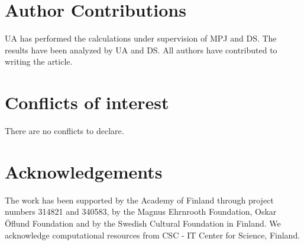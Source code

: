 \documentclass[twoside,twocolumn,9pt]{article}
\renewcommand{\refname}{Notes and references}
\begin{document}
\section*{Author Contributions} 

UA has performed the calculations under supervision of MPJ and DS. The results
have been analyzed by UA and DS. All authors have contributed to writing the 
article.
 
\section*{Conflicts of interest}

There are no conflicts to declare.

\section*{Acknowledgements}

The work has been supported by the Academy of Finland through project numbers
314821 and 340583, by the Magnus Ehrnrooth Foundation, Oskar {\"O}flund
Foundation and by the Swedish Cultural Foundation in Finland. We acknowledge
computational resources from CSC - IT Center for Science, Finland. 




\balance


\end{document}
